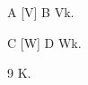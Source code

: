 \documentclass{article}
\begin{document}
\DeclareRobustCommand\cite{V}
A [\cite] B \cite{k}.

\renewcommand\cite{W}
C [\cite] D \cite{k}.
\begin{thebibliography}{9} K.\end{thebibliography}
\end{document}
